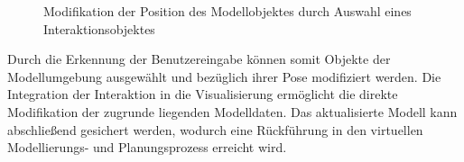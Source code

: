 \begin{figure}[!ht]
	\begin{center}
	\hspace{5mm}
	\caption{Modifikation der Position des Modellobjektes durch Auswahl eines Interaktionsobjektes}
	\label{fig.intarrows}
	\end{center}
\end{figure}

Durch die Erkennung der Benutzereingabe können somit Objekte der Modellumgebung ausgewählt und bezüglich ihrer Pose modifiziert werden. Die Integration der Interaktion in die Visualisierung ermöglicht die direkte Modifikation der zugrunde liegenden Modelldaten. Das aktualisierte Modell kann abschließend gesichert werden, wodurch eine Rückführung in den virtuellen Modellierungs- und Planungsprozess erreicht wird.

\prever{
}